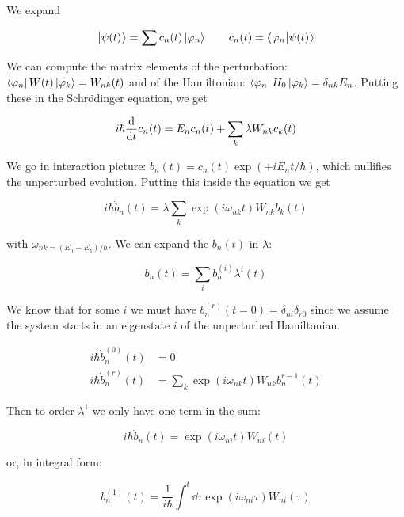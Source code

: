 \documentclass[main.tex]{subfiles}
\begin{document}
We expand

\begin{equation}
    \ket{\psi(t)} = \sum c_n(t) \ket{\varphi_n}   \qquad c_n(t) = \braket{\varphi_n}{\psi(t)}
\end{equation}

We can compute the matrix elements of the perturbation: \(\bra{\varphi_n} W(t) \ket{\varphi_k} = W_{nk}(t)\) and of the Hamiltonian:
\(\bra{\varphi_n} H_0 \ket{\varphi_k} = \delta_{nk} E_n\). Putting these in the Schrödinger equation, we get

\begin{equation}
    i \hbar \dv{}{t} c_n(t) = E_n c_n(t) + \sum _{k} \lambda W_{nk} c_k (t)
\end{equation}

We go in interaction picture: \(b_n(t) = c_n(t) \exp(+i E_n t / \hbar) \), which nullifies the unperturbed evolution.
Putting this inside the equation we get

\begin{equation}
    i \hbar \dot{b}_n(t) = \lambda \sum _k \exp(i \omega_{nk} t) W_{nk} b_k (t)
\end{equation}

with \(\omega_{nk = (E_n - E_k) / \hbar}\). We can expand the \(b_n(t)\) in \(\lambda\):

\begin{equation}
    b_n(t) = \sum _{i}  b_n ^{(i)} \lambda^i (t)
\end{equation}

We know that for some \(i\) we must have \(b_n ^{(r)}(t=0) = \delta_{ni} \delta_{r0} \) since we assume the system starts in an eigenstate \(i\) of the unperturbed Hamiltonian.

\begin{align}
    i \hbar \dot{b}_n ^{(0)}(t) &= 0  \\
    i \hbar \dot{b}_n ^{(r)}(t) &= \sum _{k} \exp(i \omega_{nk} t) W_{nk} b_n ^{r-1}(t)
\end{align}

Then to order \(\lambda^1\) we only have one term in the sum:

\begin{equation}
    i \hbar \dot{b}_n (t) = \exp(i \omega_{ni}t) W_{ni}(t)
\end{equation}

or, in integral form:

\begin{equation}
    b_n^{(1)}(t) = \frac{1}{i \hbar} \int ^t \dd{\tau} \exp(i \omega_{ni} \tau)W_{ni}(\tau)
\end{equation}
\end{document}
